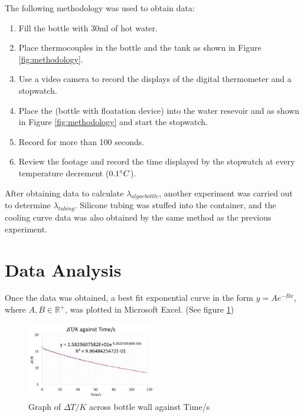 \documentclass[10pt,a4paper]{IEEEtran}
\begin{document}
	The following methodology was used to obtain data:
	\begin{enumerate}
		\item Fill the bottle with 30ml of hot water.
		\item Place thermocouples in the bottle and the tank as shown in Figure \ref{fig:methodology}.
		\item Use a video camera to record the displays of the digital thermometer and a stopwatch.
		\item Place the (bottle with floatation device) into the water resevoir and as shown in Figure \ref{fig:methodology} and start the stopwatch.
		\item Record for more than 100 seconds.
		\item Review the footage and record the time displayed by the stopwatch at every temperature decrement ($0.1 \degree C$).
	\end{enumerate}
	
	After obtaining data to calculate $\lambda_{algae bottle}$, another experiment was carried out to determine $\lambda_{tubing}$. Silicone tubing was stuffed into the container, and the cooling curve data was also obtained by the same method as the previous experiment.
	
	\section{Data Analysis}
	Once the data was obtained, a best fit exponential curve in the form $y = Ae^{-Bx}$, where $A, B \in \mathbb{R^{+}}$, was plotted in Microsoft Excel. (See figure \ref{fig:graph_lambdaBottle})
	
	\begin{figure}[H]
		\begin{center}
			\includegraphics[width=0.5\textwidth]{graph_lambdaBottle.png}
			\caption{Graph of $\Delta T/K$ across bottle wall against Time/s}
			\label{fig:graph_lambdaBottle}
		\end{center}
	\end{figure} 
	
\end{document}

